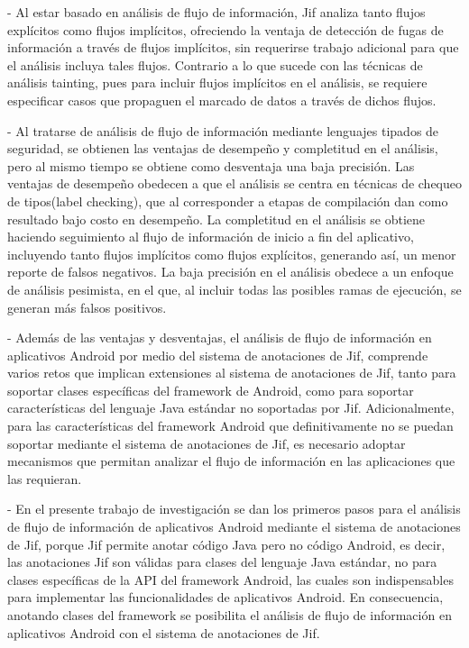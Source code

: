 - Al estar basado en análisis de flujo de información, Jif analiza tanto flujos
explícitos como flujos implícitos, ofreciendo la ventaja de detección de fugas
de información a través de flujos implícitos, sin requerirse trabajo adicional
para que el análisis incluya tales flujos. Contrario a lo que sucede con las
técnicas de análisis tainting, pues para incluir flujos implícitos en el
análisis, se requiere especificar casos que propaguen el marcado de datos a
través de dichos flujos.

- Al tratarse de análisis de flujo de información mediante lenguajes tipados de
seguridad, se obtienen las ventajas de desempeño y completitud en el análisis,
pero al mismo tiempo se obtiene como desventaja una baja precisión.\newline 
Las ventajas de desempeño obedecen a que el análisis se centra en técnicas de
chequeo de tipos(label checking), que al corresponder a etapas de compilación
dan como resultado bajo costo en desempeño.\newline
La completitud en el análisis se obtiene  haciendo seguimiento al flujo de
información de inicio a fin del aplicativo\cite{LanguageIFS-2013}, incluyendo
tanto flujos implícitos como flujos explícitos, generando así, un menor 
reporte de falsos negativos.\newline 
La baja precisión en el análisis obedece a
un enfoque de análisis pesimista, en el que, al incluir todas las posibles ramas de ejecución, se generan más
falsos positivos.

- Además de las ventajas y desventajas, el análisis de flujo de información en
aplicativos Android por medio del sistema de anotaciones de Jif,
comprende varios retos que implican extensiones al sistema de anotaciones de
Jif, tanto para soportar clases específicas del framework de Android, como para
soportar características del lenguaje Java estándar no soportadas por Jif.\newline 
Adicionalmente, para las características del framework Android que
definitivamente no se puedan soportar mediante el sistema de anotaciones de Jif,
es necesario adoptar mecanismos que permitan analizar el flujo de información en
las aplicaciones que las requieran.

- En el presente trabajo de investigación se dan los primeros pasos para el
análisis de flujo de información de aplicativos Android mediante el sistema de
anotaciones de Jif, porque Jif permite anotar código Java pero no código
Android, es decir, las anotaciones Jif son válidas para clases del lenguaje Java
estándar, no para clases específicas de la API del framework Android, las cuales
son indispensables para implementar las funcionalidades de aplicativos Android.
En consecuencia, anotando clases del framework se posibilita el análisis de
flujo de información en aplicativos Android con el sistema de anotaciones de Jif.

